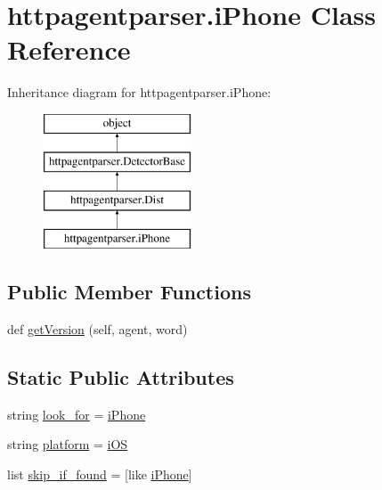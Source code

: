 \hypertarget{classhttpagentparser_1_1i_phone}{}\section{httpagentparser.\+i\+Phone Class Reference}
\label{classhttpagentparser_1_1i_phone}
Inheritance diagram for httpagentparser.\+i\+Phone\+:\begin{figure}[H]
\begin{center}
\leavevmode
\includegraphics[height=4.000000cm]{classhttpagentparser_1_1i_phone}
\end{center}
\end{figure}
\subsection*{Public Member Functions}
\begin{DoxyCompactItemize}
\item 
def \hyperlink{classhttpagentparser_1_1i_phone_a74316e075aa19f5a81efa5a583701ad9}{get\+Version} (self, agent, word)
\end{DoxyCompactItemize}
\subsection*{Static Public Attributes}
\begin{DoxyCompactItemize}
\item 
string \hyperlink{classhttpagentparser_1_1i_phone_a4804fa8dc4448a6a7fa660366a488473}{look\+\_\+for} = \textquotesingle{}\hyperlink{classhttpagentparser_1_1i_phone}{i\+Phone}\textquotesingle{}
\item 
string \hyperlink{classhttpagentparser_1_1i_phone_ad5c1eb47e0d7336f991c6c1e19dbe9f5}{platform} = \textquotesingle{}\hyperlink{classhttpagentparser_1_1i_o_s}{i\+OS}\textquotesingle{}
\item 
list \hyperlink{classhttpagentparser_1_1i_phone_ad1d4c99e1d046ea17d1a99d14b21ca7b}{skip\+\_\+if\+\_\+found} = \mbox{[}\textquotesingle{}like \hyperlink{classhttpagentparser_1_1i_phone}{i\+Phone}\textquotesingle{}\mbox{]}
\end{DoxyCompactItemize}
